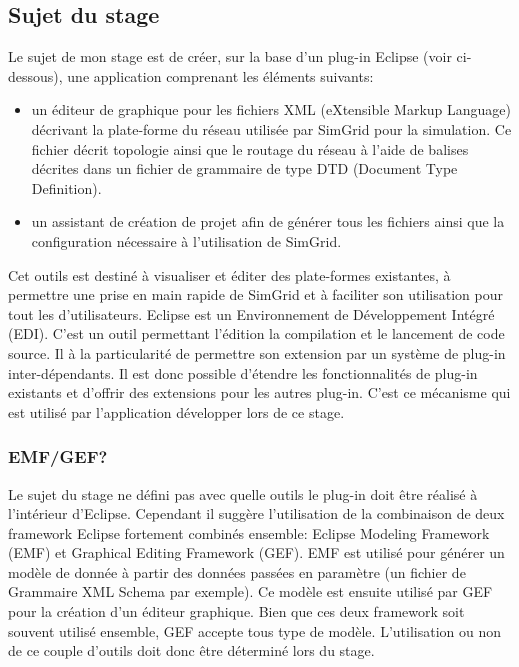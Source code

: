\documentclass{article}
\begin{document}
	\subsection{Sujet du stage}
		Le sujet de mon stage est de créer, sur la base d'un plug-in Eclipse (voir ci-dessous), une application comprenant les éléments suivants:
		\begin{itemize}
	 		\item un éditeur de graphique pour les fichiers XML (eXtensible Markup Language) décrivant la plate-forme du réseau utilisée par SimGrid pour la simulation. Ce fichier décrit topologie ainsi que le routage du réseau à l'aide de balises décrites dans un fichier de grammaire de type DTD (Document Type Definition).
	 		\item un assistant de création de projet afin de générer tous les fichiers ainsi que la configuration nécessaire à l'utilisation de SimGrid.
		\end{itemize}
	Cet outils est destiné à visualiser et éditer des plate-formes existantes, à permettre une prise en main rapide de SimGrid et à faciliter son utilisation pour tout les d'utilisateurs.
		Eclipse est un Environnement de Développement Intégré (EDI). C'est un outil permettant l'édition la compilation et le lancement de code source. Il à la particularité de permettre son extension par un système de plug-in inter-dépendants. Il est donc possible d'étendre les fonctionnalités de plug-in existants et d'offrir des extensions pour les autres plug-in. C'est ce mécanisme qui est utilisé par l'application développer lors de ce stage.
	\subsubsection{EMF/GEF?}
	Le sujet du stage ne défini pas avec quelle outils le plug-in doit être réalisé à l'intérieur d'Eclipse. Cependant il suggère l'utilisation de la combinaison de deux framework Eclipse fortement combinés ensemble: Eclipse Modeling Framework (EMF) et Graphical Editing Framework (GEF). EMF est utilisé pour générer un modèle de donnée à partir des données passées en paramètre (un fichier de Grammaire XML Schema par exemple). Ce modèle est ensuite utilisé par GEF pour la création d'un éditeur graphique. Bien que ces deux framework soit souvent utilisé ensemble, GEF accepte tous type de modèle. L'utilisation ou non de ce couple d'outils doit donc être déterminé lors du stage.
\end{document}
